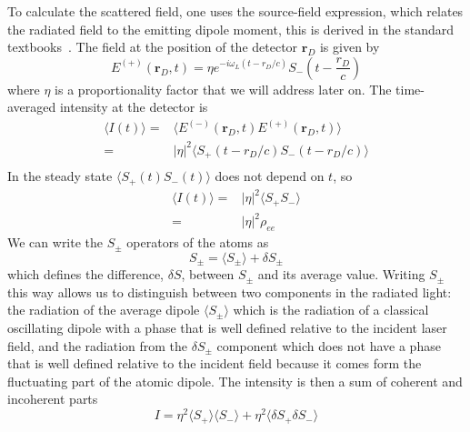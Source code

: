 \documentclass[11pt,letter]{article}
\newcommand{\bv}[1]{\ensuremath{\bm{#1}}}
\begin{document}
To calculate the scattered field, one uses the source-field expression, which
relates the radiated field to the emitting dipole moment, this is derived in
the standard textbooks~\cite{loudon2000quantum,cohen1998atom}.  The field at
the position of the detector $\bv{r}_{D}$ is given by
\begin{equation} 
    E^{(+)}( \bv{r}_{D}, t) = 
    \eta e^{- i \omega_{L} ( t -r_{D}/c) } 
    S_{-}\left(t - \frac{ r_{D} }{c} \right)
    \label{eq:source-field} 
\end{equation} where $\eta$
is a proportionality factor that we will address later on.  The time-averaged
intensity at the detector is 
\begin{equation}
\label{eq:Idef}
\begin{split}
\langle I (t) \rangle = & 
    \langle E^{(-)}(\bv{r}_{D}, t) E^{(+)}(\bv{r}_{D}, t) \rangle \\
   = & |\eta|^{2} \langle S_{+}(t-r_{D}/c)S_{-}(t-r_{D}/c) \rangle  \\
\end{split}
\end{equation}
In the steady state $\langle S_{+}(t) S_{-}(t) \rangle$ does not depend on $t$,
so
\begin{equation}
\begin{split} 
\langle I (t) \rangle  
   = & |\eta|^{2} \langle S_{+}S_{-} \rangle \\
   = & |\eta|^{2} \rho_{ee}  
\end{split} 
\end{equation}
We can write the $S_{\pm}$ operators of the atoms as 
\begin{equation} 
    S_{\pm} = \langle S_{\pm} \rangle + \delta S_{\pm} 
\end{equation}
which defines the difference, $\delta S$, between $S_{\pm}$ and its average
value.   Writing $S_{\pm}$ this way allows us to distinguish between two
components in the radiated light:  the radiation of the average dipole $\langle
S_{\pm}\rangle$ which is the radiation of a classical oscillating dipole with a
phase that is well defined relative to the incident laser field, and the
radiation from the $\delta S_{\pm}$ component which does not have a phase that
is well defined relative to the incident field because it comes form the
fluctuating part of the atomic dipole.  The intensity is then a sum of coherent
and incoherent parts 
\begin{equation} 
I  = \eta^{2} \langle S_{+}\rangle \langle S_{-} \rangle 
   + \eta^{2} \langle \delta S_{+} \delta S_{-} \rangle 
\end{equation}
\end{document}
